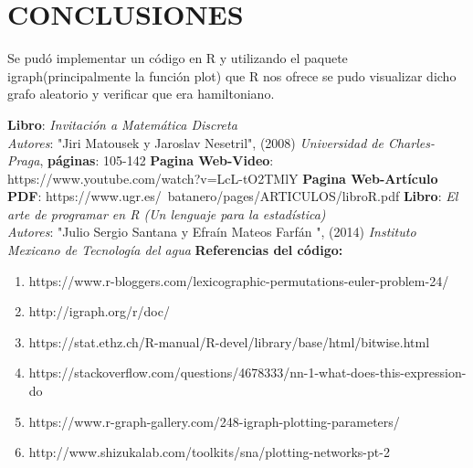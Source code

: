 \documentclass[journal]{IEEEtran}
\begin{document}
\section{\Large {\bf CONCLUSIONES}} 
Se pud{\'o} implementar un código en R y utilizando el paquete igraph(principalmente la función plot) que R nos ofrece se pudo visualizar dicho grafo aleatorio y verificar que era hamiltoniano.
\begin{thebibliography}{X}
	 \textbf{Libro}: \textit{Invitaci{\'o}n a Matem{\'a}tica Discreta} \\  \emph{Autores}: "Jiri Matousek y Jaroslav Nesetril", (2008) \textit {Universidad de Charles-Praga}, \textbf{p{\'a}ginas}: 105-142
	 \textbf{Pagina Web-Video}: https://www.youtube.com/watch?v=LcL-tO2TMlY
	 \textbf{Pagina Web-Art{\'i}culo PDF}: https://www.ugr.es/~batanero/pages/ARTICULOS/libroR.pdf
	   \textbf{Libro}: \textit{El arte de programar en R (Un lenguaje para la estad{\'i}stica)} \\  \emph{Autores}: "Julio Sergio Santana y Efra{\'i}n Mateos Farf{\'a}n ", (2014) \textit{Instituto Mexicano de Tecnolog{\'i}a del agua}
	 \textbf{Referencias del c{\'o}digo:} \\
		\begin{enumerate}
		\item https://www.r-bloggers.com/lexicographic-permutations-euler-problem-24/ \\
		\item http://igraph.org/r/doc/ \\
		\item https://stat.ethz.ch/R-manual/R-devel/library/base/html/bitwise.html \\
		\item https://stackoverflow.com/questions/4678333/nn-1-what-does-this-expression-do \\
		\item https://www.r-graph-gallery.com/248-igraph-plotting-parameters/ \\
		\item http://www.shizukalab.com/toolkits/sna/plotting-networks-pt-2 \\
	\end{enumerate} 
\end{thebibliography}
\end{document}
